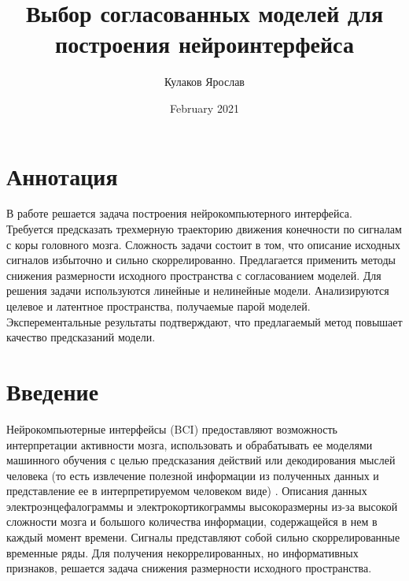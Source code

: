 \documentclass{article}
\title{Выбор согласованных моделей для построения нейроинтерфейса}
\author{Кулаков Ярослав}
\date{February 2021}
\begin{document}
\maketitle




\section{Аннотация}
В работе решается задача построения нейрокомпьютерного интерфейса. Требуется предсказать трехмерную траекторию движения конечности по сигналам с коры головного мозга. Сложность задачи состоит в том, что описание исходных сигналов избыточно и сильно скоррелированно. Предлагается применить методы снижения размерности исходного пространства с согласованием моделей. Для решения задачи используются линейные и нелинейные модели. Анализируются целевое и латентное пространства, получаемые парой моделей. Эксперементальные результаты подтверждают, что предлагаемый метод повышает качество предсказаний модели.

\section{Введение}
Нейрокомпьютерные интерфейсы (BCI) предоставляют возможность интерпретации активности мозга, использовать и обрабатывать ее моделями машинного обучения с целью предсказания действий или декодирования мыслей человека (то есть извлечение полезной информации из полученных данных и представление ее в интерпретируемом человеком виде) \cite{general_purpose_1300799} \cite{BLANKERTZ20101303}. Описания данных электроэнцефалограммы и электрокортикограммы высокоразмерны из-за высокой сложности мозга и большого количества информации, содержащейся в нем в каждый момент времени. Сигналы представляют собой сильно скоррелированные временные ряды. Для получения некоррелированных, но информативных признаков, решается задача снижения размерности исходного пространства.\cite{feature_selection_ecog} \cite{ATYABI2013319} \cite{7330455} \par
\end{document}

